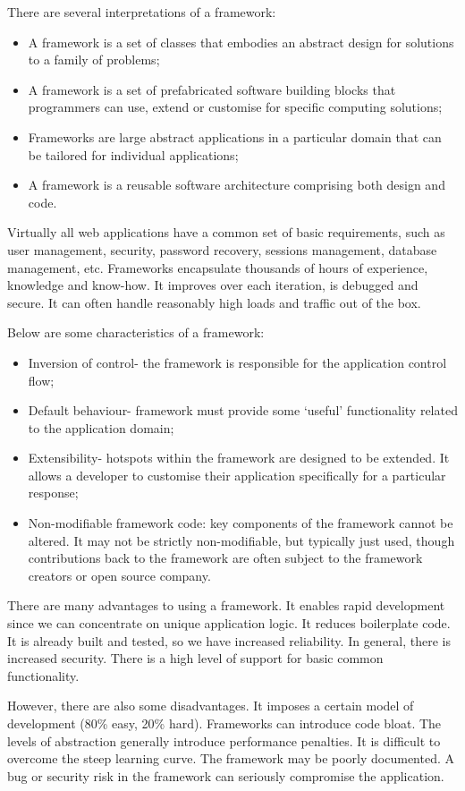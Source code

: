 \documentclass[a4paper, openany]{memoir}
\begin{document}
\noindent There are several interpretations of a framework:
\begin{itemize}
    \item A framework is a set of classes that embodies an abstract design for solutions to a family of problems;
    \item A framework is a set of prefabricated software building blocks that programmers can use, extend or customise for specific computing solutions;
    \item Frameworks are large abstract applications in a particular domain that can be tailored for individual applications;
    \item A framework is a reusable software architecture comprising both design and code.
\end{itemize}
Virtually all web applications have a common set of basic requirements, such as user management, security, password recovery, sessions management, database management, etc. Frameworks encapsulate thousands of hours of experience, knowledge and know-how. It improves over each iteration, is debugged and secure. It can often handle reasonably high loads and traffic out of the box.

\noindent Below are some characteristics of a framework:
\begin{itemize}
    \item Inversion of control- the framework is responsible for the application control flow;
    \item Default behaviour- framework must provide some `useful' functionality related to the application domain;
    \item Extensibility- hotspots within the framework are designed to be extended. It allows a developer to customise their application specifically for a particular response;
    \item Non-modifiable framework code: key components of the framework cannot be altered. It may not be strictly non-modifiable, but typically just used, though contributions back to the framework are often subject to the framework creators or open source company.
\end{itemize}
There are many advantages to using a framework. It enables rapid development since we can concentrate on unique application logic. It reduces boilerplate code. It is already built and tested, so we have increased reliability. In general, there is increased security. There is a high level of support for basic common functionality.

\noindent However, there are also some disadvantages. It imposes a certain model of development (80\% easy, 20\% hard). Frameworks can introduce code bloat. The levels of abstraction generally introduce performance penalties. It is difficult to overcome the steep learning curve. The framework may be poorly documented. A bug or security risk in the framework can seriously compromise the application.
\end{document}
